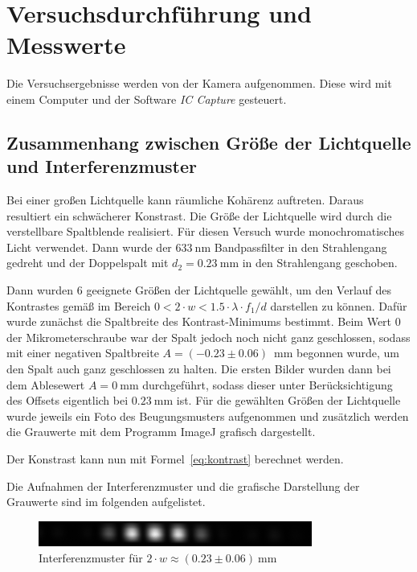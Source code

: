 \documentclass{article}
\begin{document}
\newpage


\section{Versuchsdurchführung und Messwerte}

Die Versuchsergebnisse werden von der Kamera aufgenommen. Diese wird mit einem Computer und der Software \textit{IC Capture} gesteuert.


\subsection{Zusammenhang zwischen Größe der Lichtquelle und Interferenzmuster}

Bei einer großen Lichtquelle kann räumliche Kohärenz auftreten. Daraus resultiert ein schwächerer Konstrast. Die Größe der Lichtquelle wird durch die verstellbare Spaltblende realisiert. Für diesen Versuch wurde monochromatisches Licht verwendet. Dann wurde der $633~$nm Bandpassfilter in den Strahlengang gedreht und der  Doppelspalt mit $d_2 = 0.23~$mm in den Strahlengang geschoben.

Dann wurden 6 geeignete Größen der Lichtquelle gewählt, um den Verlauf des Kontrastes gemäß im Bereich $0 < 2\cdot w < 1.5 \cdot \lambda\cdot f_1 / d$ darstellen zu können. Dafür wurde zunächst die Spaltbreite des Kontrast-Minimums bestimmt. Beim Wert 0 der Mikrometerschraube war der Spalt jedoch noch nicht ganz geschlossen, sodass mit einer negativen Spaltbreite $A=(-0.23 \pm 0.06)$~mm begonnen wurde, um den Spalt auch ganz geschlossen zu halten. Die ersten Bilder wurden dann bei dem Ablesewert $A=0~$mm durchgeführt, sodass dieser unter Berücksichtigung des Offsets eigentlich bei $0.23~$mm ist.
Für die gewählten Größen der Lichtquelle wurde jeweils ein Foto des Beugungsmusters aufgenommen und zusätzlich werden die Grauwerte mit dem Programm ImageJ grafisch dargestellt.

Der Konstrast kann nun mit Formel~\ref{eq:kontrast} berechnet werden.

Die Aufnahmen der Interferenzmuster und die grafische Darstellung der Grauwerte sind im folgenden aufgelistet.

\begin{figure}[H]
\centering
\caption{Interferenzmuster für $2\cdot w \approx (0.23\pm0.06)~$mm}
\includegraphics[width=9cm]{moodle/img2.png}
\end{figure}
\end{document}
